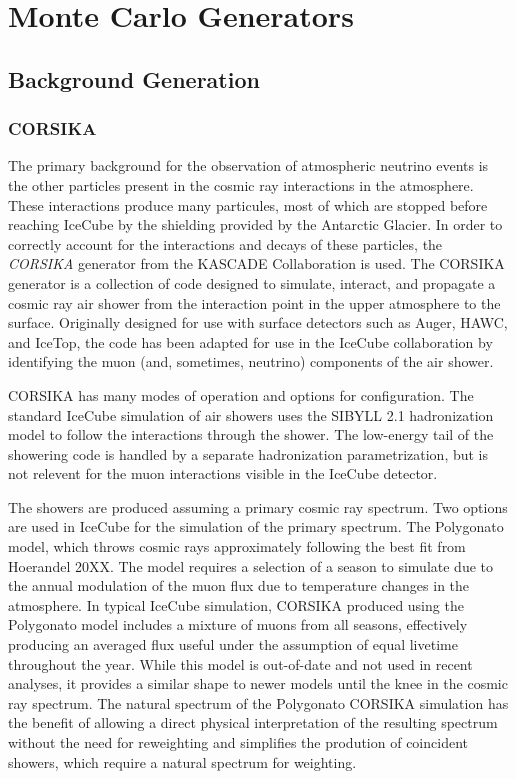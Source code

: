 \section{Monte Carlo Generators}
\label{subsec:bg_generation}
\subsection{Background Generation}
\label{subsubsec:corsika}
\subsubsection{CORSIKA}
The primary background for the observation of atmospheric neutrino events is the other particles present in the cosmic ray interactions in the atmosphere.
These interactions produce many particules, most of which are stopped before reaching IceCube by the shielding provided by the Antarctic Glacier.
In order to correctly account for the interactions and decays of these particles, the \emph{CORSIKA} generator from the KASCADE Collaboration is used. 
The CORSIKA generator is a collection of code designed to simulate, interact, and propagate a cosmic ray air shower from the interaction point in the upper atmosphere to the surface. 
Originally designed for use with surface detectors such as Auger, HAWC, and IceTop, the code has been adapted for use in the IceCube collaboration by identifying the muon (and, sometimes, neutrino) components of the air shower.

CORSIKA has many modes of operation and options for configuration. 
The standard IceCube simulation of air showers uses the SIBYLL 2.1 hadronization model to follow the interactions through the shower. 
The low-energy tail of the showering code is handled by a separate hadronization parametrization, but is not relevent for the muon interactions visible in the IceCube detector.

The showers are produced assuming a primary cosmic ray spectrum.
Two options are used in IceCube for the simulation of the primary spectrum. 
The Polygonato model, which throws cosmic rays approximately following the best fit from Hoerandel 20XX. 
The model requires a selection of a season to simulate due to the annual modulation of the muon flux due to temperature changes in the atmosphere.
In typical IceCube simulation, CORSIKA produced using the Polygonato model includes a mixture of muons from all seasons, effectively producing an averaged flux useful under the assumption of equal livetime throughout the year.
While this model is out-of-date and not used in recent analyses, it provides a similar shape to newer models until the knee in the cosmic ray spectrum.
The natural spectrum of the Polygonato CORSIKA simulation has the benefit of allowing a direct physical interpretation of the resulting spectrum without the need for reweighting and simplifies the prodution of coincident showers, which require a natural spectrum for weighting.

